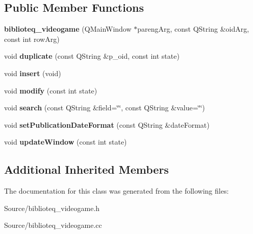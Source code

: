 \subsection*{Public Member Functions}
\begin{DoxyCompactItemize}
\item 
{\bfseries biblioteq\+\_\+videogame} (Q\+Main\+Window $\ast$pareng\+Arg, const Q\+String \&oid\+Arg, const int row\+Arg)\hypertarget{classbiblioteq__videogame_a089bc36f7535fee9fa4edd329ac3d5f7}{}\label{classbiblioteq__videogame_a089bc36f7535fee9fa4edd329ac3d5f7}

\item 
void {\bfseries duplicate} (const Q\+String \&p\+\_\+oid, const int state)\hypertarget{classbiblioteq__videogame_abd19c8c36646158bdda33075236e4922}{}\label{classbiblioteq__videogame_abd19c8c36646158bdda33075236e4922}

\item 
void {\bfseries insert} (void)\hypertarget{classbiblioteq__videogame_ad9456c707dbfb382d83b26890e70fd84}{}\label{classbiblioteq__videogame_ad9456c707dbfb382d83b26890e70fd84}

\item 
void {\bfseries modify} (const int state)\hypertarget{classbiblioteq__videogame_acc0e4822674716ef5b4eb838d10bcaed}{}\label{classbiblioteq__videogame_acc0e4822674716ef5b4eb838d10bcaed}

\item 
void {\bfseries search} (const Q\+String \&field=\char`\"{}\char`\"{}, const Q\+String \&value=\char`\"{}\char`\"{})\hypertarget{classbiblioteq__videogame_a42dbc4359bd2d8563f18f9ccbc37b5d9}{}\label{classbiblioteq__videogame_a42dbc4359bd2d8563f18f9ccbc37b5d9}

\item 
void {\bfseries set\+Publication\+Date\+Format} (const Q\+String \&date\+Format)\hypertarget{classbiblioteq__videogame_a3bb1fe56621b3c0eddc147336f0bf000}{}\label{classbiblioteq__videogame_a3bb1fe56621b3c0eddc147336f0bf000}

\item 
void {\bfseries update\+Window} (const int state)\hypertarget{classbiblioteq__videogame_a6a062a4e4eec4fd507f32d210a612034}{}\label{classbiblioteq__videogame_a6a062a4e4eec4fd507f32d210a612034}

\end{DoxyCompactItemize}
\subsection*{Additional Inherited Members}


The documentation for this class was generated from the following files\+:\begin{DoxyCompactItemize}
\item 
Source/biblioteq\+\_\+videogame.\+h\item 
Source/biblioteq\+\_\+videogame.\+cc\end{DoxyCompactItemize}
